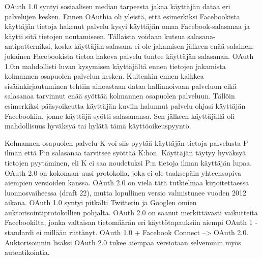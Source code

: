 \documentclass[finnish,gradu]{tktltiki}
\begin{document}
  OAuth 1.0 syntyi sosiaalisen median tarpeesta jakaa käyttäjän dataa eri palvelujen kesken. Ennen OAuthia oli yleistä, että esimerkiksi Facebookista käyttäjän tietoja hakenut palvelu kysyi käyttäjän omaa Facebook-salasanaa ja käytti sitä tietojen noutamiseen. Tällaista voidaan kutsua salasana-antipatterniksi, koska käyttäjän salasana ei ole jakamisen jälkeen enää salainen: jokainen Facebookista tietoa hakeva palvelu tuntee käyttäjän salasanan. OAuth 1.0:n mahdollisti luvan kysymisen käyttäjältä ennen tietojen jakamista kolmannen osapuolen palvelun kesken. Kuitenkin ennen kaikkea sisäänkirjautuminen tehtiin ainoastaan dataa hallinnoivaan palveluun eikä salasanaa tarvinnut enää syöttää kolmannen osapuolen palveluun. Tällöin esimerkiksi pääsyoikeutta käyttäjän kuviin halunnut palvelu ohjasi käyttäjän Facebookiin, jonne käyttäjä syötti salasanansa. Sen jälkeen käyttäjällä oli mahdollisuus hyväksyä tai hylätä tämä käyttöoikeuspyyntö.

  Kolmannen osapuolen palvelu K voi siis pyytää käyttäjän tietoja palvelusta P ilman että P:n salasanaa tarvitsee syöttää K:hon. Käyttäjän täytyy hyväksyä tietojen pyytäminen, eli K ei saa noudetuksi P:n tietoja ilman käyttäjän lupaa.
  OAuth 2.0 on kokonaan uusi protokolla, joka ei ole taaksepäin yhteensopiva aiempien versioiden kanssa. OAuth 2.0 on vielä tätä tutkielmaa kirjoitettaessa luonnosvaiheessa (draft 22), mutta lopullinen versio valmistunee vuoden 2012 aikana. OAuth 1.0 syntyi pitkälti Twitterin ja Googlen omien auktorisointiprotokollien pohjalta. OAuth 2.0 on saanut merkittävästi vaikutteita Facebookilta, jonka valtaisan tietomäärän eri käyttötapauksiin aiempi OAuth 1 -standardi ei millään riittänyt. OAuth 1.0 + Facebook Connect --> OAuth 2.0. Auktorisoinnin lisäksi OAuth 2.0 tukee aiempaa versiotaan selvemmin myös autentikointia.
\end{document}
